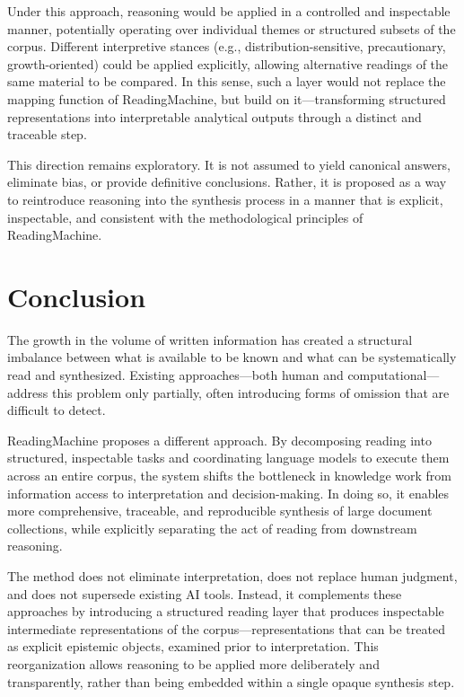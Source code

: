 \documentclass[
  11pt,
]{article}
\begin{document}
Under this approach, reasoning would be applied in a controlled and
inspectable manner, potentially operating over individual themes or
structured subsets of the corpus. Different interpretive stances (e.g.,
distribution-sensitive, precautionary, growth-oriented) could be applied
explicitly, allowing alternative readings of the same material to be
compared. In this sense, such a layer would not replace the mapping
function of ReadingMachine, but build on it---transforming structured
representations into interpretable analytical outputs through a distinct
and traceable step.

This direction remains exploratory. It is not assumed to yield canonical
answers, eliminate bias, or provide definitive conclusions. Rather, it
is proposed as a way to reintroduce reasoning into the synthesis process
in a manner that is explicit, inspectable, and consistent with the
methodological principles of ReadingMachine.

\section{Conclusion}\label{conclusion}

The growth in the volume of written information has created a structural
imbalance between what is available to be known and what can be
systematically read and synthesized. Existing approaches---both human
and computational---address this problem only partially, often
introducing forms of omission that are difficult to detect.

ReadingMachine proposes a different approach. By decomposing reading
into structured, inspectable tasks and coordinating language models to
execute them across an entire corpus, the system shifts the bottleneck
in knowledge work from information access to interpretation and
decision-making. In doing so, it enables more comprehensive, traceable,
and reproducible synthesis of large document collections, while
explicitly separating the act of reading from downstream reasoning.

The method does not eliminate interpretation, does not replace human
judgment, and does not supersede existing AI tools. Instead, it
complements these approaches by introducing a structured reading layer
that produces inspectable intermediate representations of the
corpus---representations that can be treated as explicit epistemic
objects, examined prior to interpretation. This reorganization allows
reasoning to be applied more deliberately and transparently, rather than
being embedded within a single opaque synthesis step.
\end{document}
